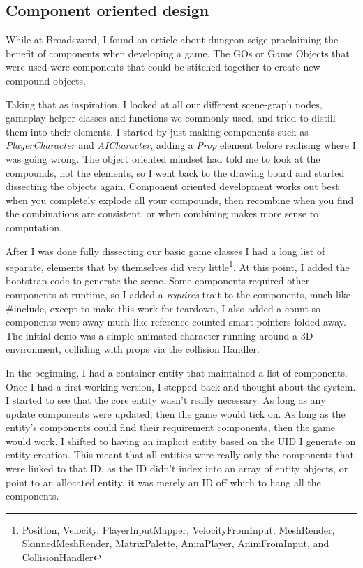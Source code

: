 \subsection{Component oriented design}

While at Broadsword, I found an article about dungeon seige proclaiming the
benefit of components when developing a game. The GOs or Game Objects that were
used were components that could be stitched together to create new compound
objects.

Taking that as inspiration, I looked at all our different scene-graph nodes,
gameplay helper classes and functions we commonly used, and tried to distill
them into their elements. I started by just making components such as
\emph{PlayerCharacter} and \emph{AICharacter}, adding a \emph{Prop} element
before realising where I was going wrong. The object oriented mindset had told
me to look at the compounds, not the elements, so I went back to the drawing
board and started dissecting the objects again. Component oriented development
works out best when you completely explode all your compounds, then recombine
when you find the combinations are consistent, or when combining makes more
sense to computation.

After I was done fully dissecting our basic game classes I had a long list of
separate, elements that by themselves did very little\footnote{ Position,
Velocity, PlayerInputMapper, VelocityFromInput, MeshRender, SkinnedMeshRender,
MatrixPalette, AnimPlayer, AnimFromInput, and CollisionHandler}. At this point,
I added the bootstrap code to generate the scene. Some components required
other components at runtime, so I added a \emph{requires} trait to the
components, much like \#include, except to make this work for teardown, I also
added a count so components went away much like reference counted smart
pointers folded away. The initial demo was a simple animated character running
around a 3D environment, colliding with props via the collision Handler.

In the beginning, I had a container entity that maintained a list of
components.  Once I had a first working version, I stepped back and thought
about the system. I started to see that the core entity wasn't really
necessary. As long as any update components were updated, then the game would
tick on. As long as the entity's components could find their requirement
components, then the game would work. I shifted to having an implicit entity
based on the UID I generate on entity creation. This meant that all entities
were really only the components that were linked to that ID, as the ID didn't
index into an array of entity objects, or point to an allocated entity, it was
merely an ID off which to hang all the components.

